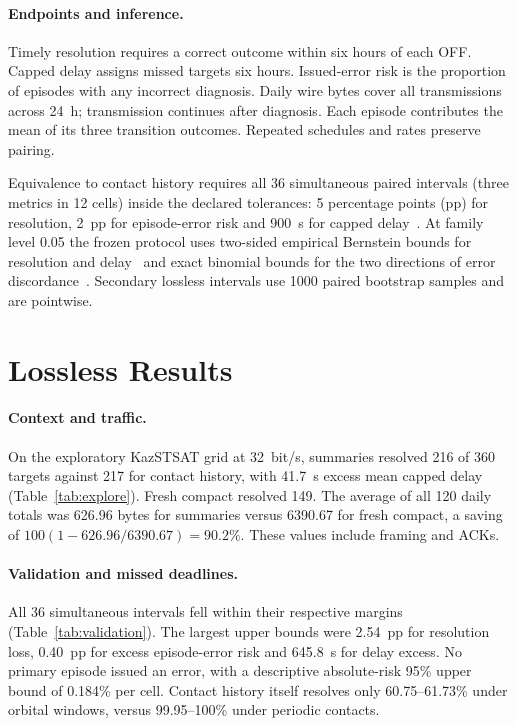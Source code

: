 \documentclass[a4paper]{llncs}
\begin{document}
\paragraph{Endpoints and inference.} Timely resolution requires a correct outcome within six hours of each OFF. Capped delay assigns missed targets six hours. Issued-error risk is the proportion of episodes with any incorrect diagnosis. Daily wire bytes cover all transmissions across 24~h; transmission continues after diagnosis. Each episode contributes the mean of its three transition outcomes. Repeated schedules and rates preserve pairing.

Equivalence to contact history requires all 36 simultaneous paired intervals (three metrics in 12 cells) inside the declared tolerances: 5 percentage points (pp) for resolution, 2~pp for episode-error risk and 900~s for capped delay~\cite{lakens2017}. At family level 0.05 the frozen protocol uses two-sided empirical Bernstein bounds for resolution and delay~\cite{maurer2009} and exact binomial bounds for the two directions of error discordance~\cite{clopper1934}. Secondary lossless intervals use 1000 paired bootstrap samples and are pointwise.

\section{Lossless Results}

\paragraph{Context and traffic.} On the exploratory KazSTSAT grid at 32~bit/s, summaries resolved 216 of 360 targets against 217 for contact history, with 41.7~s excess mean capped delay (Table~\ref{tab:explore}). Fresh compact resolved 149. The average of all 120 daily totals was 626.96 bytes for summaries versus 6390.67 for fresh compact, a saving of $100(1-626.96/6390.67)=90.2\%$. These values include framing and ACKs.


\paragraph{Validation and missed deadlines.} All 36 simultaneous intervals fell within their respective margins (Table~\ref{tab:validation}). The largest upper bounds were 2.54~pp for resolution loss, 0.40~pp for excess episode-error risk and 645.8~s for delay excess. No primary episode issued an error, with a descriptive absolute-risk 95\% upper bound of 0.184\% per cell. Contact history itself resolves only 60.75--61.73\% under orbital windows, versus 99.95--100\% under periodic contacts.

\end{document}
